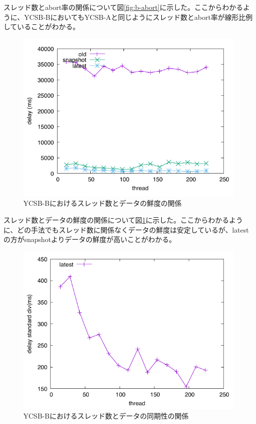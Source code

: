 \documentclass[a4paper]{jreport}	%
\begin{document}
スレッド数とabort率の関係について図\ref{fig:b-abort}に示した。ここからわかるように、YCSB-BにおいてもYCSB-Aと同じようにスレッド数とabort率が線形比例していることがわかる。


\begin{figure}[h] 
\centering
\includegraphics[width=15cm]{ycsb-b/opposite-delay}
\caption{YCSB-Bにおけるスレッド数とデータの鮮度の関係}
\label{fig:b-delay}
\end{figure}

スレッド数とデータの鮮度の関係について図\ref{fig:b-delay}に示した。ここからわかるように、どの手法でもスレッド数に関係なくデータの鮮度は安定しているが、latestの方がsnapshotよりデータの鮮度が高いことがわかる。


\begin{figure}[h] 
\centering
\includegraphics[width=15cm]{ycsb-b/opposite-stddiv}
\caption{YCSB-Bにおけるスレッド数とデータの同期性の関係}
\label{fig:b-stddiv}
\end{figure}
\end{document}
